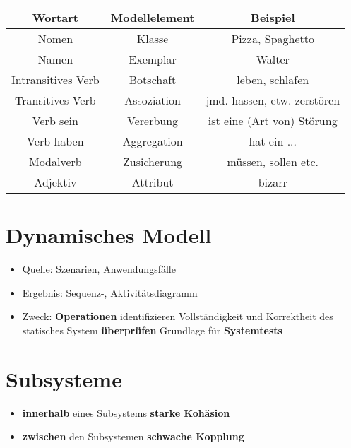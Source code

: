 \documentclass[a4paper]{article}
\theoremstyle{break}
\begin{document}
\begin{tabular}{|c|c|c|}
	\hline 
	\textbf{Wortart} & \textbf{Modellelement} & \textbf{Beispiel} \\
	\hline 
	Nomen & Klasse & Pizza, Spaghetto \\ 
	\hline 
	Namen & Exemplar & Walter \\ 
	\hline 
	Intransitives Verb & Botschaft & leben, schlafen  \\ 
	\hline 
	Transitives Verb & Assoziation & jmd. hassen, etw. zerstören \\ 
	\hline 
	Verb sein & Vererbung & ist eine (Art von) Störung  \\ 
	\hline 
	Verb haben & Aggregation & hat ein ...  \\ 
	\hline 
	Modalverb & Zusicherung  & müssen, sollen etc.  \\ 
	\hline 
	Adjektiv & Attribut & bizarr  \\ 
	\hline 
\end{tabular}
 
\section{Dynamisches Modell}
\begin{itemize}
	\item Quelle: Szenarien, Anwendungsfälle
	\item Ergebnis: Sequenz-, Aktivitätsdiagramm
	\item Zweck:
	\subitem  \textbf{Operationen} identifizieren
	\subitem Vollständigkeit und Korrektheit des statisches System \textbf{überprüfen}
	\subitem Grundlage für \textbf{Systemtests}
\end{itemize}
\section{Subsysteme}
\begin{itemize}
	\item \textbf{innerhalb} eines Subsystems \textbf{starke Kohäsion}
	\item \textbf{zwischen} den Subsystemen \textbf{schwache Kopplung}
\end{itemize}
\end{document}
